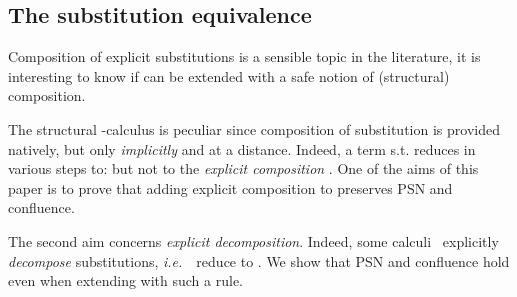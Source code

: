 \documentclass{LMCS}
\newcommand{\ie}{{\it  i.e.}~}
\renewcommand{\>}{\rightarrow}
\newcommand{\deft}[1]{{\bf #1}}
\newcommand{\ignore}[1]{}
\begin{document}
\ignore{We showed that the relation
  , defined as , is confluent. In
  the framework of rewriting modulo an equivalence relation there are
  various, non-equivalent, forms of confluence. The one we showed is
  the weakest one. The strongest one is the so-called
  \textit{Church-Rosser modulo} property (see~\cite{terese} for its
  definition). It can easily be shown (see~\cite{phdaccattoli}) that
   is Church-Rosser Modulo  (it follows from 
  being a strong bisimulation)\footnote{Actually, in order to close
    the Church-Rosser diagram  is not necessary so that one gets
    an even stronger confluence property, which has no name in the
    literature.}}


\ignore{The fact that  is a strong bisimulation means that if we
  prove a normalisation result for a term  then the result
  immediately lifts to all the terms in , \ie, the
  -equivalence class of . In order to simplify some
  reasonings we shall restrict to consider only canonical
  representants of -equivalence classes. Consider the reduction
  relations:
 
And let  be the relation obtained as the context closure
of . For us a term in
\deft{-form} will be a -normal form. Let us show
that -forms make sense:

\begin{lem}
. The relation  is strongly normalizing and confluent modulo .
\end{lem}
}

\subsection{The  substitution equivalence}
\label{s:propp-intro}
Composition of explicit substitutions is a sensible topic in the
literature, it is interesting to know if
 can be extended with a safe notion of (structural) composition.

The structural -calculus is peculiar 
since composition of substitution is 
provided natively, but only \textit{implicitly} and at a distance.  Indeed, a term
 s.t.    reduces in various
steps to:
 but not to the \textit{explicit
  composition} . One of the aims of this paper is to
prove that adding explicit composition to  preserves PSN and confluence.

The second aim concerns \textit{explicit
  decomposition}. Indeed, some calculi~\cite{OH06,MaraistOTW99,Schw99,HZ09,Hasegawa} explicitly
\textit{decompose} substitutions, \ie\ reduce  to
. We show that PSN and confluence hold even when extending
 with such a rule.\medskip
\end{document}
